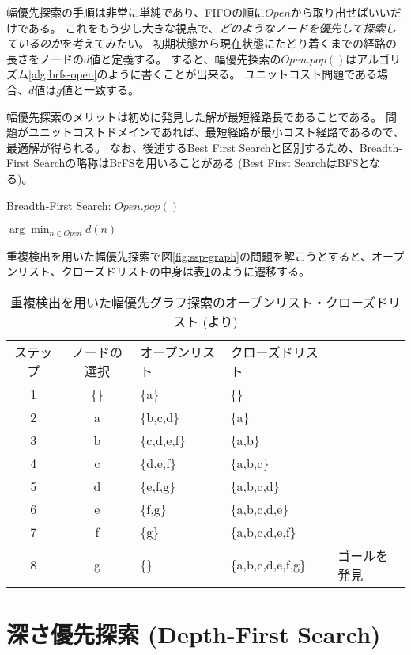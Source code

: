 幅優先探索の手順は非常に単純であり、FIFOの順に$Open$から取り出せばいいだけである。
これをもう少し大きな視点で、{\it どのようなノードを優先して探索しているのか}を考えてみたい。
初期状態から現在状態にたどり着くまでの経路の長さをノードの$d$値と定義する。
すると、幅優先探索の$Open.pop()$はアルゴリズム\ref{alg:brfs-open}のように書くことが出来る。
ユニットコスト問題である場合、$d$値は$g$値と一致する。

幅優先探索のメリットは初めに発見した解が最短経路長であることである。
問題がユニットコストドメインであれば、最短経路が最小コスト経路であるので、最適解が得られる。
なお、後述するBest First Searchと区別するため、Breadth-First Searchの略称はBrFSを用いることがある (Best First SearchはBFSとなる)。

\begin{algorithm}
\caption{Breadth-First Search: $Open.pop()$}
\label{alg:brfs-open}
	\Return $\arg \min_{n \in Open} d(n)$
\end{algorithm}

重複検出を用いた幅優先探索で図\ref{fig:ssp-graph}の問題を解こうとすると、オープンリスト、クローズドリストの中身は表\ref{tbl:brfs-traj}のように遷移する。

\begin{table}[tbh]
\centering
\caption{重複検出を用いた幅優先グラフ探索のオープンリスト・クローズドリスト (\cite{edelkamp:2010:hst:1875144}より)}
\begin{tabular}{c|c|l|l|l}
	ステップ & ノードの選択 & オープンリスト & クローズドリスト & \\
	1 	  & \{\}       & \{a\}      & \{\} \\
	2     & a        & \{b,c,d\}  & \{a\} \\
	3     & b        & \{c,d,e,f\} & \{a,b\} \\
	4     & c        & \{d,e,f\}   & \{a,b,c\} \\
	5     & d        & \{e,f,g\}   & \{a,b,c,d\} \\
	6     & e        & \{f,g\}     & \{a,b,c,d,e\} \\
	7     & f        & \{g\}       & \{a,b,c,d,e,f\} \\
	8     & g        & \{\}        & \{a,b,c,d,e,f,g\} & ゴールを発見 \\
\end{tabular}
\label{tbl:brfs-traj}
\end{table}

\section{深さ優先探索 (Depth-First Search)}
\label{sec:depth-first-search}


